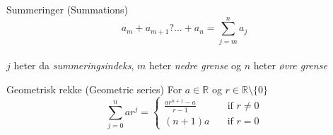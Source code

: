 \begin{frame}{Summeringer (Summations)}
    $$a_m + a_{m+1} ? ... + a_n = \displaystyle\sum_{j=m}^{n} a_j$$\\
    $j$ heter da \textit{summeringsindeks}, $m$ heter \textit{nedre grense} og $n$ heter \textit{øvre grense}\\
    \pause
    \begin{block}{Geometrisk rekke (Geometric series)}
        For $a \in \mathbb{R}$ og $r \in \mathbb{R}\setminus\{0\}$
        $$\displaystyle\sum_{j=0}^{n} ar^j = \begin{cases}
            \frac{ar^{n+1} - a}{r - 1} & \quad \text{if } r \neq 0\\
            (n+1)a                     & \quad \text{if } r = 0
          \end{cases}$$
    \end{block}
\end{frame}

